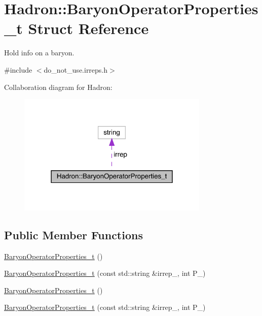 \hypertarget{structHadron_1_1BaryonOperatorProperties__t}{}\section{Hadron\+:\+:Baryon\+Operator\+Properties\+\_\+t Struct Reference}
\label{structHadron_1_1BaryonOperatorProperties__t}


Hold info on a baryon.  




{\ttfamily \#include $<$do\+\_\+not\+\_\+use.\+irreps.\+h$>$}



Collaboration diagram for Hadron\+:\nopagebreak
\begin{figure}[H]
\begin{center}
\leavevmode
\includegraphics[width=259pt]{d7/d2d/structHadron_1_1BaryonOperatorProperties__t__coll__graph}
\end{center}
\end{figure}
\subsection*{Public Member Functions}
\begin{DoxyCompactItemize}
\item 
\mbox{\hyperlink{structHadron_1_1BaryonOperatorProperties__t_a473494cc88a9f80c5a54b487f2d6d768}{Baryon\+Operator\+Properties\+\_\+t}} ()
\item 
\mbox{\hyperlink{structHadron_1_1BaryonOperatorProperties__t_abeb72a1861d69240e37cbe96b936eef5}{Baryon\+Operator\+Properties\+\_\+t}} (const std\+::string \&irrep\+\_\+, int P\+\_\+)
\item 
\mbox{\hyperlink{structHadron_1_1BaryonOperatorProperties__t_a473494cc88a9f80c5a54b487f2d6d768}{Baryon\+Operator\+Properties\+\_\+t}} ()
\item 
\mbox{\hyperlink{structHadron_1_1BaryonOperatorProperties__t_abeb72a1861d69240e37cbe96b936eef5}{Baryon\+Operator\+Properties\+\_\+t}} (const std\+::string \&irrep\+\_\+, int P\+\_\+)
\end{DoxyCompactItemize}
